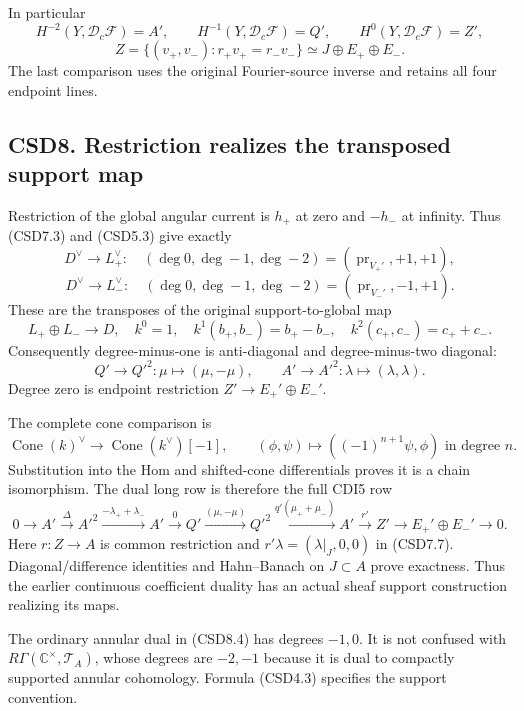 In particular \[
H^{-2}(Y,\mathscr D_c\mathscr F)=A',\qquad
H^{-1}(Y,\mathscr D_c\mathscr F)=Q',\qquad
H^0(Y,\mathscr D_c\mathscr F)=Z',
\] \[
Z=\{(v_+,v_-):r_+v_+=r_-v_-\}\simeq J\oplus E_+\oplus E_-.
\tag{CSD7.7}
\] The last comparison uses the original Fourier-source inverse and
retains all four endpoint lines.

\subsection{CSD8. Restriction realizes the transposed support
map}\label{csd8.-restriction-realizes-the-transposed-support-map}

Restriction of the global angular current is \(h_+\) at zero and
\(-h_-\) at infinity. Thus (CSD7.3) and (CSD5.3) give exactly \[
D^\vee\to L_+^\vee:
\quad(\deg0,\deg-1,\deg-2)=(\operatorname{pr}_{V_+'},+1,+1),
\] \[
D^\vee\to L_-^\vee:
\quad(\deg0,\deg-1,\deg-2)=(\operatorname{pr}_{V_-'},-1,+1).
\tag{CSD8.1}
\] These are the transposes of the original support-to-global map \[
L_+\oplus L_-\to D,\quad
k^0=1,\quad k^1(b_+,b_-)=b_+-b_-,\quad k^2(c_+,c_-)=c_++c_-.
\tag{CSD8.2}
\] Consequently degree-minus-one is anti-diagonal and degree-minus-two
diagonal: \[
Q'\to Q'^2:\mu\mapsto(\mu,-\mu),\qquad
A'\to A'^2:\lambda\mapsto(\lambda,\lambda).
\tag{CSD8.3}
\] Degree zero is endpoint restriction \(Z'\to E_+'\oplus E_-'\).

The complete cone comparison is \[
\operatorname{Cone}(k)^\vee
\longrightarrow\operatorname{Cone}(k^\vee)[-1],\qquad
(\phi,\psi)\mapsto((-1)^{n+1}\psi,\phi)\text{ in degree }n.
\tag{CSD8.4}
\] Substitution into the Hom and shifted-cone differentials proves it is
a chain isomorphism. The dual long row is therefore the full CDI5 row \[
0\to A'\xrightarrow{\Delta}A'^2
\xrightarrow{-\lambda_++\lambda_-}A'
\xrightarrow0Q'\xrightarrow{(\mu,-\mu)}Q'^2
\xrightarrow{q'(\mu_++\mu_-)}A'
\xrightarrow{r'}Z'\to E_+'\oplus E_-'\to0.
\tag{CSD8.5}
\] Here \(r:Z\to A\) is common restriction and
\(r'\lambda=(\lambda|_J,0,0)\) in (CSD7.7). Diagonal/difference
identities and Hahn--Banach on \(J\subset A\) prove exactness. Thus the
earlier continuous coefficient duality has an actual sheaf support
construction realizing its maps.

The ordinary annular dual in (CSD8.4) has degrees \(-1,0\). It is not
confused with \(R\Gamma(\mathbb C^\times,\mathscr T_A)\), whose degrees
are \(-2,-1\) because it is dual to compactly supported annular
cohomology. Formula (CSD4.3) specifies the support convention.

